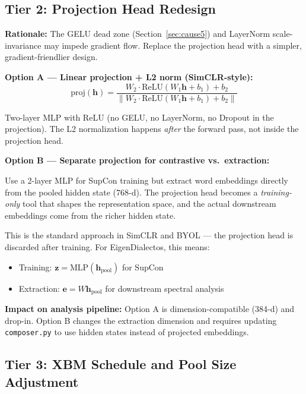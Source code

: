 \documentclass[11pt,a4paper]{article}
\begin{document}
\subsection{Tier 2: Projection Head Redesign}
\label{sec:tier2}

\textbf{Rationale:} The GELU dead zone (Section~\ref{sec:cause5}) and LayerNorm
scale-invariance may impede gradient flow. Replace the projection head with a
simpler, gradient-friendlier design.

\textbf{Option A --- Linear projection + L2 norm (SimCLR-style):}
\begin{equation}
\text{proj}(\mathbf{h}) = \frac{W_2 \cdot \text{ReLU}(W_1 \mathbf{h} + b_1) + b_2}{\|W_2 \cdot \text{ReLU}(W_1 \mathbf{h} + b_1) + b_2\|}
\end{equation}

Two-layer MLP with ReLU (no GELU, no LayerNorm, no Dropout in the projection). The
L2 normalization happens \emph{after} the forward pass, not inside the projection head.

\textbf{Option B --- Separate projection for contrastive vs.\ extraction:}

Use a 2-layer MLP for SupCon training but extract word embeddings directly from the
pooled hidden state (768-d). The projection head becomes a \emph{training-only} tool
that shapes the representation space, and the actual downstream embeddings come from
the richer hidden state.

This is the standard approach in SimCLR and BYOL --- the projection head is discarded
after training. For EigenDialectos, this means:
\begin{itemize}[nosep]
  \item Training: $\mathbf{z} = \text{MLP}(\mathbf{h}_{\text{pool}})$ for SupCon
  \item Extraction: $\mathbf{e} = W\mathbf{h}_{\text{pool}}$ for downstream spectral analysis
\end{itemize}

\textbf{Impact on analysis pipeline:} Option A is dimension-compatible (384-d) and
drop-in. Option B changes the extraction dimension and requires updating
\texttt{composer.py} to use hidden states instead of projected embeddings.

\subsection{Tier 3: XBM Schedule and Pool Size Adjustment}
\label{sec:tier3}
\end{document}

